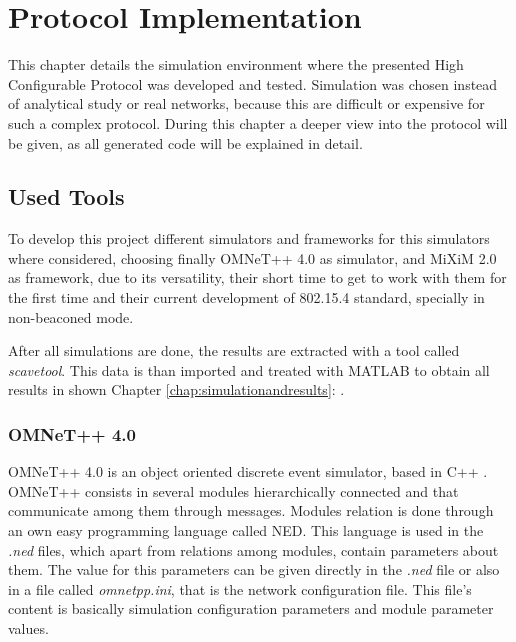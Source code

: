 \chapter{Protocol Implementation}
\label{chap:protocolimplementation}

This chapter details the simulation environment where the presented High Configurable Protocol was developed and tested. Simulation was chosen 
instead of analytical study or real networks, because this are difficult or expensive for such a complex protocol. During this chapter a 
deeper view into the protocol will be given, as all generated code will be explained in detail.

\section{Used Tools}

To develop this project different simulators and frameworks for this simulators where considered, choosing finally \ac{OMNeT++} 4.0 \cite{OMNeT}
as simulator, and \ac{MiXiM} 2.0 \cite{MiXiM} as framework, due to its versatility, their short time to get to work with them for the first time and 
their current development of 802.15.4 standard, specially in non-beaconed mode.

After all simulations are done, the results are extracted with a tool called \textit{scavetool}. This data is than imported and treated with 
\ac{MATLAB} \cite{MATLAB} to obtain all results in shown Chapter \ref{chap:simulationandresults}: .

\subsection{\ac{OMNeT++} 4.0}

\ac{OMNeT++} 4.0 is an object oriented discrete event simulator, based in C++ \cite{cpp}. \ac{OMNeT++} consists in several modules hierarchically
connected and that communicate among them through messages. Modules relation is done through an own easy programming language called \ac{NED}.
This language is used in the \textit{.ned} files, which apart from relations among modules, contain parameters about them. The value for this
parameters can be given directly in the \textit{.ned} file or also in a file called \textit{omnetpp.ini}, that is the network configuration file.
This file's content is basically simulation configuration parameters and module parameter values.

